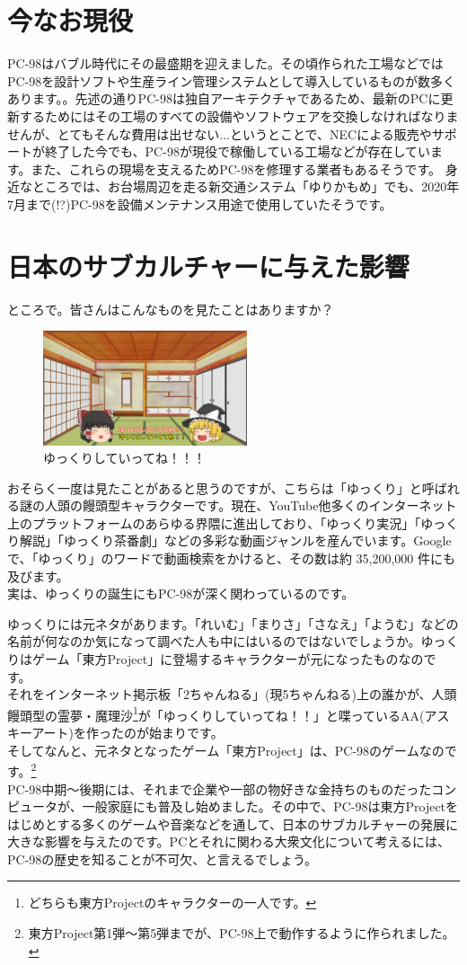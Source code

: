 \documentclass[b5paper,9pt,platex,dvipdfmx]{jsarticle}
\begin{document}
\begin{multicols}{3}
\section[short]{今なお現役}
PC-98はバブル時代にその最盛期を迎えました。その頃作られた工場などではPC-98を設計ソフトや生産ライン管理システムとして導入しているものが数多くあります。。先述の通りPC-98は独自アーキテクチャであるため、最新のPCに更新するためにはその工場のすべての設備やソフトウェアを交換しなければなりませんが、とてもそんな費用は出せない...というとことで、NECによる販売やサポートが終了した今でも、PC-98が現役で稼働している工場などが存在しています。また、これらの現場を支えるためPC-98を修理する業者もあるそうです。
身近なところでは、お台場周辺を走る新交通システム「ゆりかもめ」でも、2020年7月まで(!?)PC-98を設備メンテナンス用途で使用していたそうです。
\section[short]{日本のサブカルチャーに与えた影響}
ところで。皆さんはこんなものを見たことはありますか？
\begin{figure}[H]
  \centering
  \includegraphics[width=6cm]{img-1.png}
  \caption{ゆっくりしていってね！！！}
\end{figure}
  おそらく一度は見たことがあると思うのですが、こちらは「ゆっくり」と呼ばれる謎の人頭の饅頭型キャラクターです。現在、YouTube他多くのインターネット上のプラットフォームのあらゆる界隈に進出しており、「ゆっくり実況」「ゆっくり解説」「ゆっくり茶番劇」などの多彩な動画ジャンルを産んでいます。Googleで、「ゆっくり」のワードで動画検索をかけると、その数は約 35,200,000 件にも及びます。\\
実は、ゆっくりの誕生にもPC-98が深く関わっているのです。

ゆっくりには元ネタがあります。「れいむ」「まりさ」「さなえ」「ようむ」などの名前が何なのか気になって調べた人も中にはいるのではないでしょうか。ゆっくりはゲーム「東方Project」に登場するキャラクターが元になったものなのです。\\
それをインターネット掲示板「2ちゃんねる」(現5ちゃんねる)上の誰かが、人頭饅頭型の霊夢・魔理沙\footnote{どちらも東方Projectのキャラクターの一人です。}が「ゆっくりしていってね！！」と喋っているAA(アスキーアート)を作ったのが始まりです。\\
そしてなんと、元ネタとなったゲーム「東方Project」は、PC-98のゲームなのです。\footnote{東方Project第1弾～第5弾までが、PC-98上で動作するように作られました。}\\
PC-98中期～後期には、それまで企業や一部の物好きな金持ちのものだったコンピュータが、一般家庭にも普及し始めました。その中で、PC-98は東方Projectをはじめとする多くのゲームや音楽などを通して、日本のサブカルチャーの発展に大きな影響を与えたのです。PCとそれに関わる大衆文化について考えるには、PC-98の歴史を知ることが不可欠、と言えるでしょう。

\end{multicols}
\end{document}
